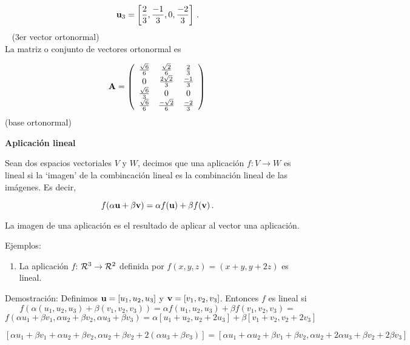 \documentclass[
]{agujournal2019}
\providecommand{\tightlist}{%
  \setlength{\itemsep}{0pt}\setlength{\parskip}{0pt}}\usepackage{longtable,booktabs,array}
\begin{document}
\[{\textbf u}_3=\left[ \frac{2}{3},\frac{-1}{3},0,\frac{-2}{3}\right]\,.\]
~ (3er vector ortonormal)\\

La matriz o conjunto de vectores ortonormal es

\[{\textbf A}=\left(\begin{array}{cccc}
  \frac{\sqrt{6}}{6} & \frac{\sqrt{2}}{6} & \frac{2}{3}\\
  0 & \frac{2\sqrt{2}}{3} & \frac{-1}{3}\\
  \frac{\sqrt{6}}{3} & 0 & 0\\
  \frac{\sqrt{6}}{6} & \frac{-\sqrt{2}}{6} & \frac{-2}{3}\\
\end{array}
  \right)
\,\] (base ortonormal)

\vspace{0.5cm}

\textbf{Aplicación lineal}

Sean dos espacios vectoriales \(V\) y \(W\), decimos que una aplicación
\(f:V \rightarrow W\) es lineal si la `imagen' de la combincación lineal
es la combinación lineal de las imágenes. Es decir,

\[f(\alpha {\textbf u} + \beta {\textbf v} )=\alpha f({\textbf u}) + \beta f({\textbf v})\,.\]

La imagen de una aplicación es el resultado de aplicar al vector una
aplicación.

Ejemplos:

\vspace{0.5cm}

\begin{enumerate}
\def\labelenumi{(\arabic{enumi})}
\tightlist
\item
  La aplicación \(f\): \({\cal R}^3 \rightarrow {\cal R}^2\) definida
  por \(f(x,y,z)=(x+y,y+2z)\) es lineal.
\end{enumerate}

Demostración: Definimos \({\textbf u}=[u_1,u_2,u_3]\) y
\({\textbf v}=[v_1,v_2,v_3]\). Entonces \(f\) es lineal si
\[f(\alpha (u_1,u_2,u_3) + \beta(v_1,v_2,v_3))=\alpha f(u_1,u_2,u_3) + \beta f(v_1,v_2,v_3)=\]
\[f(\alpha u_1 + \beta v_1,\alpha u_2 + \beta v_2,\alpha u_3 + \beta v_3 )=\alpha [u_1 + u_2,u_2 + 2u_3] +
\beta [v_1 + v_2,v_2 + 2v_3]\]

\[[\alpha u_1 + \beta v_1 + \alpha u_2 + \beta v_2,\alpha u_2 + \beta v_2 + 2 (\alpha u_3 + \beta v_3)]=
[\alpha u_1 + \alpha u_2 + \beta v_1 + \beta v_2, \alpha u_2 + 2\alpha u_3 + \beta v_2 + 2\beta v_3]\]
\end{document}
